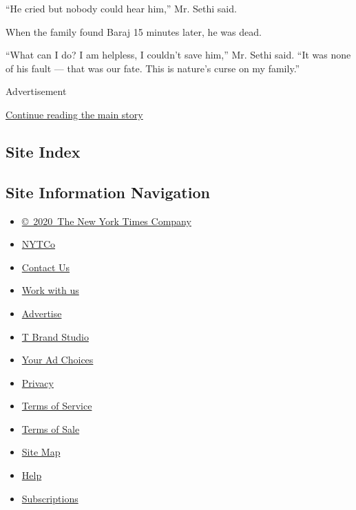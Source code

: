 ``He cried but nobody could hear him,'' Mr. Sethi said.

When the family found Baraj 15 minutes later, he was dead.

``What can I do? I am helpless, I couldn't save him,'' Mr. Sethi said.
``It was none of his fault --- that was our fate. This is nature's curse
on my family.''

Advertisement

\protect\hyperlink{after-bottom}{Continue reading the main story}

\hypertarget{site-index}{%
\subsection{Site Index}\label{site-index}}

\hypertarget{site-information-navigation}{%
\subsection{Site Information
Navigation}\label{site-information-navigation}}

\begin{itemize}
\tightlist
\item
  \href{https://help.nytimes.com/hc/en-us/articles/115014792127-Copyright-notice}{©~2020~The
  New York Times Company}
\end{itemize}

\begin{itemize}
\tightlist
\item
  \href{https://www.nytco.com/}{NYTCo}
\item
  \href{https://help.nytimes.com/hc/en-us/articles/115015385887-Contact-Us}{Contact
  Us}
\item
  \href{https://www.nytco.com/careers/}{Work with us}
\item
  \href{https://nytmediakit.com/}{Advertise}
\item
  \href{http://www.tbrandstudio.com/}{T Brand Studio}
\item
  \href{https://www.nytimes.com/privacy/cookie-policy\#how-do-i-manage-trackers}{Your
  Ad Choices}
\item
  \href{https://www.nytimes.com/privacy}{Privacy}
\item
  \href{https://help.nytimes.com/hc/en-us/articles/115014893428-Terms-of-service}{Terms
  of Service}
\item
  \href{https://help.nytimes.com/hc/en-us/articles/115014893968-Terms-of-sale}{Terms
  of Sale}
\item
  \href{https://spiderbites.nytimes.com}{Site Map}
\item
  \href{https://help.nytimes.com/hc/en-us}{Help}
\item
  \href{https://www.nytimes.com/subscription?campaignId=37WXW}{Subscriptions}
\end{itemize}
